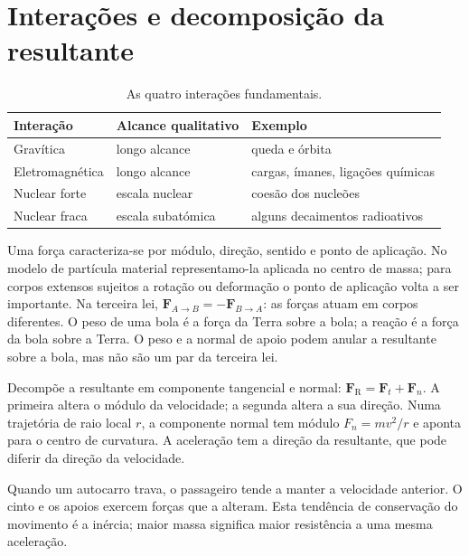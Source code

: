 \documentclass[11pt,a4paper,oneside]{book}
\newcommand{\vect}[1]{\boldsymbol{#1}}
\begin{document}
\section{Interações e decomposição da resultante}
\begin{table}[H]
\centering\small
\caption{As quatro interações fundamentais.}
\begin{tabularx}{\textwidth}{@{}p{}p{}X@{}}
\toprule
Interação & Alcance qualitativo & Exemplo\\\midrule
Gravítica & longo alcance & queda e órbita\\
Eletromagnética & longo alcance & cargas, ímanes, ligações químicas\\
Nuclear forte & escala nuclear & coesão dos nucleões\\
Nuclear fraca & escala subatómica & alguns decaimentos radioativos\\
\bottomrule\end{tabularx}
\end{table}
Uma força caracteriza-se por módulo, direção, sentido e ponto de aplicação.
No modelo de partícula material representamo-la aplicada no centro de
massa; para corpos extensos sujeitos a rotação ou deformação o ponto de
aplicação volta a ser importante.
Na terceira lei, $\vect F_{A\to B}=-\vect F_{B\to A}$:
as forças atuam em corpos diferentes. O peso de uma bola é a força da
Terra sobre a bola; a reação é a força da bola sobre a Terra.
O peso e a normal de apoio podem anular a resultante sobre a bola, mas
não são um par da terceira lei.

\begin{center}
\end{center}
Decompõe a resultante em componente tangencial e normal:
$\vect F_{\mathrm R}=\vect F_t+\vect F_n$. A primeira altera o
módulo da velocidade; a segunda altera a sua direção.
Numa trajetória de raio local $r$, a componente normal tem
módulo $F_n=mv^2/r$ e aponta para o centro de curvatura.
A aceleração tem a direção da resultante, que pode diferir
da direção da velocidade.
\begin{mundo}
Quando um autocarro trava, o passageiro tende a manter a velocidade
anterior. O cinto e os apoios exercem forças que a alteram. Esta
tendência de conservação do movimento é a inércia; maior massa
significa maior resistência a uma mesma aceleração.
\end{mundo}
\end{document}
